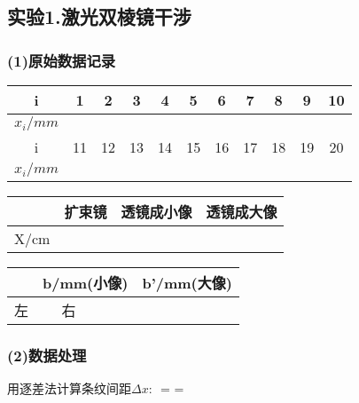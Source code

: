 \subsection*{实验1.激光双棱镜干涉}
\subsubsection*{(1)原始数据记录}

\begin{center}
\begin{table}[htbp]
\begin{tabular}{|c|c|c|c|c|c|c|c|c|c|c|}
\hline
i & 1 & 2 & 3 & 4 & 5 & 6 & 7 & 8 & 9 & 10
\\
\hline
$x_i/mm$
{%
{%
&%
{%
{%
\\
\hline
i & 11 & 12 & 13 & 14 & 15 & 16 & 17 & 18 & 19 & 20
\\
\hline
$x_i/mm$
{%
{%
&%
{%
{%
\\
\hline
\end{tabular}
\end{table}
\begin{table}[htbp]
\begin{tabular}{|c|c|c|c|}
\hline
   & 扩束镜 & 透镜成小像 & 透镜成大像 \\
\hline
X/cm
{%
&%
{%
\\
\hline
\end{tabular}
\end{table}
\begin{table}[htbp]
\begin{tabular}{|c|c|c|c|c|}
\hline
 & \multicolumn{2}{|c|}{b/mm(小像) }& \multicolumn{2}{|c|}{b'/mm(大像)} \\
\hline
左 & %
\hline
右 & %
\hline
\end{tabular}
\end{table}
\end{center}

\subsubsection*{(2)数据处理}
用逐差法计算条纹间距${\Delta}x$:
$$ = \displaystyle{} = %

